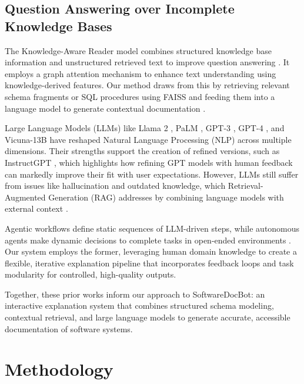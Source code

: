 \documentclass[11pt]{article}
\begin{document}
\subsection{Question Answering over Incomplete Knowledge Bases}

The Knowledge-Aware Reader model combines structured knowledge base information and unstructured retrieved text to improve question answering \citep{xiong-etal-2019-knowledge}. It employs a graph attention mechanism to enhance text understanding using knowledge-derived features. Our method draws from this by retrieving relevant schema fragments or SQL procedures using FAISS and feeding them into a language model to generate contextual documentation \citep{xiong-etal-2019-knowledge}.


Large Language Models (LLMs) like Llama 2 \citep{touvron2023llama}, PaLM \citep{chowdhery2023palm}, GPT-3 \citep{brown2020language}, GPT-4 \citep{achiam2023gpt4}, and Vicuna-13B \citep{chiang2023vicuna} have reshaped Natural Language Processing (NLP) across multiple dimensions. Their strengths support the creation of refined versions, such as InstructGPT \citep{ouyang2022training}, which highlights how refining GPT models with human feedback can markedly improve their fit with user expectations. However, LLMs still suffer from issues like hallucination and outdated knowledge, which Retrieval-Augmented Generation (RAG) addresses by combining language models with external context \citep{lewis2020retrieval, siriwardhana2023improving, lin2023ra, gao2023retrieval}.

Agentic workflows define static sequences of LLM-driven steps, while autonomous agents make dynamic decisions to complete tasks in open-ended environments \citep{zhuge2023mindstorms,hong2024data,zhang2024mobileexperts,wang2023voyager}. Our system employs the former, leveraging human domain knowledge to create a flexible, iterative explanation pipeline that incorporates feedback loops and task modularity for controlled, high-quality outputs.

Together, these prior works inform our approach to SoftwareDocBot: an interactive explanation system that combines structured schema modeling, contextual retrieval, and large language models to generate accurate, accessible documentation of software systems.


\section{Methodology}
\end{document}
